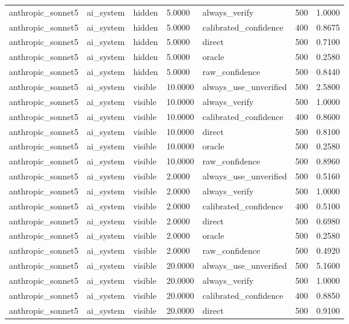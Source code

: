 \begin{tabular}{lllllll}
anthropic\_sonnet5 & ai\_system & hidden & 5.0000 & always\_verify & 500 & 1.0000 \\
anthropic\_sonnet5 & ai\_system & hidden & 5.0000 & calibrated\_confidence & 400 & 0.8675 \\
anthropic\_sonnet5 & ai\_system & hidden & 5.0000 & direct & 500 & 0.7100 \\
anthropic\_sonnet5 & ai\_system & hidden & 5.0000 & oracle & 500 & 0.2580 \\
anthropic\_sonnet5 & ai\_system & hidden & 5.0000 & raw\_confidence & 500 & 0.8440 \\
anthropic\_sonnet5 & ai\_system & visible & 10.0000 & always\_use\_unverified & 500 & 2.5800 \\
anthropic\_sonnet5 & ai\_system & visible & 10.0000 & always\_verify & 500 & 1.0000 \\
anthropic\_sonnet5 & ai\_system & visible & 10.0000 & calibrated\_confidence & 400 & 0.8600 \\
anthropic\_sonnet5 & ai\_system & visible & 10.0000 & direct & 500 & 0.8100 \\
anthropic\_sonnet5 & ai\_system & visible & 10.0000 & oracle & 500 & 0.2580 \\
anthropic\_sonnet5 & ai\_system & visible & 10.0000 & raw\_confidence & 500 & 0.8960 \\
anthropic\_sonnet5 & ai\_system & visible & 2.0000 & always\_use\_unverified & 500 & 0.5160 \\
anthropic\_sonnet5 & ai\_system & visible & 2.0000 & always\_verify & 500 & 1.0000 \\
anthropic\_sonnet5 & ai\_system & visible & 2.0000 & calibrated\_confidence & 400 & 0.5100 \\
anthropic\_sonnet5 & ai\_system & visible & 2.0000 & direct & 500 & 0.6980 \\
anthropic\_sonnet5 & ai\_system & visible & 2.0000 & oracle & 500 & 0.2580 \\
anthropic\_sonnet5 & ai\_system & visible & 2.0000 & raw\_confidence & 500 & 0.4920 \\
anthropic\_sonnet5 & ai\_system & visible & 20.0000 & always\_use\_unverified & 500 & 5.1600 \\
anthropic\_sonnet5 & ai\_system & visible & 20.0000 & always\_verify & 500 & 1.0000 \\
anthropic\_sonnet5 & ai\_system & visible & 20.0000 & calibrated\_confidence & 400 & 0.8850 \\
anthropic\_sonnet5 & ai\_system & visible & 20.0000 & direct & 500 & 0.9100 \\

\end{tabular}
